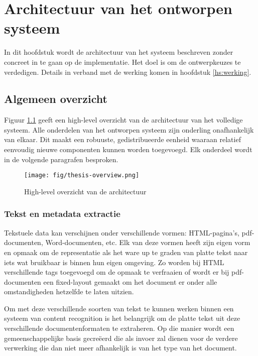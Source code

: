 \chapter{Architectuur van het ontworpen systeem}

In dit hoofdstuk wordt de architectuur van het systeem beschreven zonder concreet in
te gaan op de implementatie. Het doel is om de ontwerpkeuzes te verdedigen. Details in verband met de werking komen in hoofdstuk \ref{hs:werking}. 

\section{Algemeen overzicht}

Figuur \ref{fig:overzicht-architectuur} geeft een high-level overzicht van de architectuur van het volledige systeem. Alle onderdelen van het ontworpen systeem zijn onderling onafhankelijk van elkaar. Dit maakt een robuuste, gedistribueerde eenheid waaraan relatief eenvoudig nieuwe componenten kunnen worden toegevoegd. Elk onderdeel wordt in de volgende paragrafen besproken.

\begin{figure}[h]
	\caption{High-level overzicht van de architectuur}
	\label{fig:overzicht-architectuur}
	
	\texttt{[image: fig/thesis-overview.png]}
\end{figure}

\subsection{Tekst en metadata extractie}
Tekstuele data kan verschijnen onder verschillende vormen: HTML-pagina's, pdf-documenten, Word-documenten, etc. Elk van deze vormen heeft zijn eigen vorm en opmaak om de representatie als het ware up te graden van platte tekst naar iets wat bruikbaar is binnen hun eigen omgeving. Zo worden bij HTML verschillende tags toegevoegd om de opmaak te verfraaien of wordt er bij pdf-documenten een fixed-layout gemaakt om het document er onder alle omstandigheden hetzelfde te laten uitzien. 

Om met deze verschillende soorten van tekst te kunnen werken binnen een systeem van content recognition is het belangrijk om de platte tekst uit deze verschillende documentenformaten te extraheren. Op die manier wordt een gemeenschappelijke basis gecre\"eerd die als invoer zal dienen voor de verdere verwerking die dan niet meer afhankelijk is van het type van het document.

